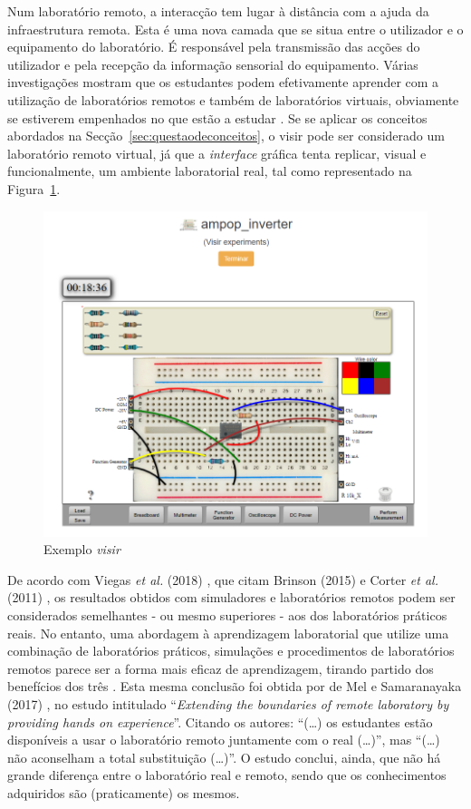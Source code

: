 Num laboratório remoto, a interacção tem lugar à distância com a ajuda da infraestrutura remota. Esta é uma nova camada que se situa entre o utilizador e o equipamento do laboratório. É responsável pela transmissão das acções do utilizador e pela recepção da informação sensorial do equipamento.
Várias investigações mostram que os estudantes podem efetivamente aprender com a utilização de laboratórios remotos e também de laboratórios virtuais, obviamente se estiverem empenhados no que estão a estudar \cite{RemoteLabsImpactVISIR}. Se se aplicar os conceitos abordados na Secção~\ref{sec:questaodeconceitos}, o \acrshort{visir} pode ser considerado um laboratório remoto virtual, já que a \textit{interface} gráfica tenta replicar, visual e funcionalmente, um ambiente laboratorial real, tal como representado na Figura~\ref{fig:exemplo_visir}. 

\begin{figure}[hbtp]
    \centering
    \includegraphics[width=0.4\linewidth]{figures/visir_sch.png}
    \caption{Exemplo \textit{\acrshort{visir}}}
    \label{fig:exemplo_visir}
\end{figure}

De acordo com Viegas \textit{et al.} (2018) \cite{ImpactRemoteLabTeachingPractices}, que citam Brinson (2015) \cite{BRINSON2015218} e Corter \textit{et al.} (2011) \cite{CORTER20112054}, os resultados obtidos com simuladores e laboratórios remotos podem ser considerados semelhantes - ou mesmo superiores - aos dos laboratórios práticos reais. No entanto, uma abordagem à aprendizagem laboratorial que utilize uma combinação de laboratórios práticos, simulações e procedimentos de laboratórios remotos parece ser a forma mais eficaz de aprendizagem, tirando partido dos benefícios dos três \cite{BRINSON2015218}. Esta mesma conclusão foi obtida por de Mel e Samaranayaka (2017) \cite{deMel}, no estudo intitulado ``\textit{Extending the boundaries of remote laboratory by providing hands on experience}''. Citando os autores: ``(\ldots) os estudantes estão disponíveis a usar o laboratório remoto juntamente com o real (\ldots)'', mas ``(\ldots) não aconselham a total substituição (\ldots)''. O estudo conclui, ainda, que não há grande diferença entre o laboratório real e remoto, sendo que os conhecimentos adquiridos são (praticamente) os mesmos.

